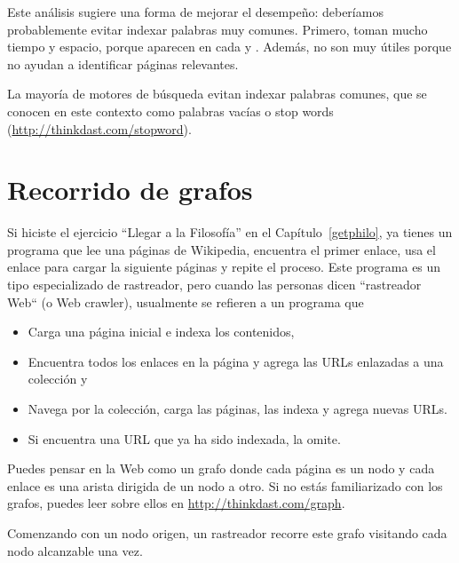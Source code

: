 \documentclass[12pt]{book}
\theoremstyle{exercise}
\begin{document}
Este análisis sugiere una forma de mejorar el desempeño: deberíamos probablemente
evitar indexar palabras muy comunes. Primero, toman mucho tiempo y espacio,
porque aparecen en cada  y . Además, no son
muy útiles porque no ayudan a identificar páginas relevantes.


La mayoría de motores de búsqueda evitan indexar palabras comunes, que se
conocen en este contexto como palabras vacías o stop words 
(\url{http://thinkdast.com/stopword}).


\section{Recorrido de grafos}
\label{graph-traversal}

Si hiciste el ejercicio ``Llegar a la Filosofía'' en el Capítulo~\ref{getphilo}, 
ya tienes un programa que lee una páginas de Wikipedia, encuentra el primer
enlace, usa el enlace para cargar la siguiente páginas y repite el proceso. Este
programa es un tipo especializado de rastreador, pero cuando las personas
dicen ``rastreador Web`` (o Web crawler), usualmente se refieren a un programa que

\begin{itemize}

\item
  Carga una página inicial e indexa los contenidos,

\item
  Encuentra todos los enlaces en la página y agrega las URLs enlazadas a una
  colección y

\item
  Navega por la colección, carga las páginas, las indexa y agrega
  nuevas URLs.

\item
  Si encuentra una URL que ya ha sido indexada, la omite.

\end{itemize}

Puedes pensar en la Web como un grafo
donde cada página es un nodo y cada enlace es una arista dirigida de un nodo
a otro. Si no estás familiarizado con los grafos, puedes leer sobre ellos
en \url{http://thinkdast.com/graph}.


Comenzando con un nodo origen, un rastreador recorre este grafo
visitando cada nodo alcanzable una vez.
\end{document}

